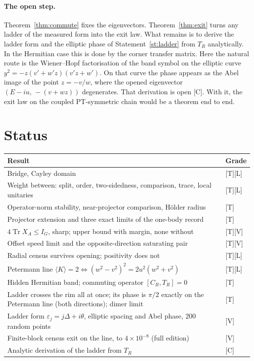 \documentclass[11pt]{article}
\theoremstyle{definition}
\newcommand{\grade}[1]{\textsf{\small[#1]}}
\newcommand{\Tr}{\operatorname{Tr}}
\begin{document}
\paragraph{The open step.} Theorem~\ref{thm:commute} fixes the eigenvectors. Theorem~\ref{thm:exit} turns any ladder of the measured form into the exit law. What remains is to derive the ladder form and the elliptic phase of Statement~\ref{st:ladder} from $T_R$ analytically. In the Hermitian case this is done by the corner transfer matrix. Here the natural route is the Wiener--Hopf factorisation of the band symbol on the elliptic curve $y^2=-z(v'+w'z)(v'z+w')$. On that curve the phase appears as the Abel image of the point $z=-v/w$, where the opened eigenvector $(E-iu,\,-(v+wz))$ degenerates. That derivation is open \grade{C}. With it, the exit law on the coupled PT-symmetric chain would be a theorem end to end.

\section{Status}\label{sec:status}
\begin{center}\small
\begin{tabular}{p{}l}\toprule
Result & Grade\\\midrule
Bridge, Cayley domain & \grade{T}\grade{L}\\
Weight between: split, order, two-sidedness, comparison, trace, local unitaries & \grade{T}\grade{L}\\
Operator-norm stability, near-projector comparison, Hölder radius & \grade{T}\\
Projector extension and three exact limits of the one-body record & \grade{T}\\
$4\Tr X_A\le I_G$, sharp; upper bound with margin, none without & \grade{T}\grade{V}\\
Offset speed limit and the opposite-direction saturating pair & \grade{T}\grade{V}\\
Radial census survives opening; positivity does not & \grade{T}\grade{L}\\
Petermann line $\langle K\rangle=2\iff(w^2-v^2)^2=2u^2(w^2+v^2)$ & \grade{T}\grade{L}\\
Hidden Hermitian band; commuting operator $[C_R,T_R]=0$ & \grade{T}\\
Ladder crosses the rim all at once; its phase is $\pi/2$ exactly on the Petermann line (both directions); dimer limit & \grade{T}\\
Ladder form $\varepsilon_j=j\Delta+i\theta$, elliptic spacing and Abel phase, 200 random points & \grade{V}\\
Finite-block census exit on the line, to $4\times10^{-8}$ (full edition) & \grade{V}\\
Analytic derivation of the ladder from $T_R$ & \grade{C}\\\bottomrule
\end{tabular}
\end{center}
\end{document}
